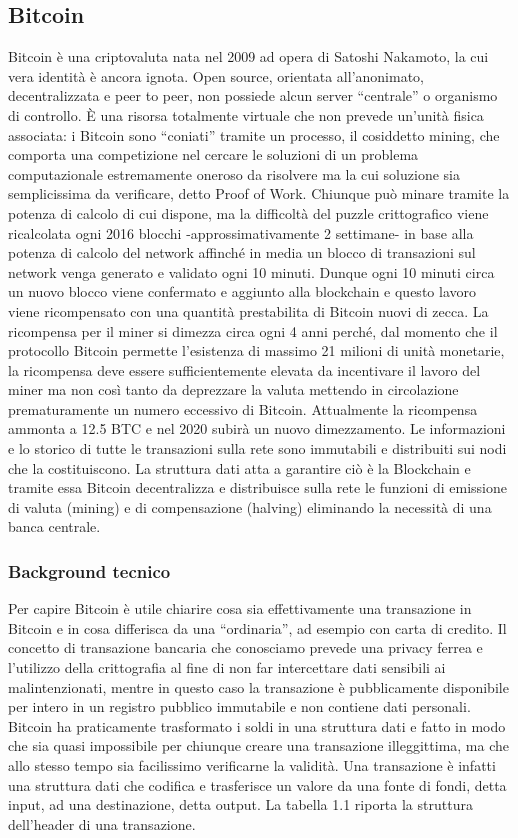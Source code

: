 \subsection{Bitcoin}
Bitcoin è una criptovaluta nata nel 2009 ad opera di Satoshi Nakamoto, la cui vera identità è ancora ignota. Open source, orientata all’anonimato, decentralizzata e peer to peer, non possiede alcun server “centrale” o organismo di controllo. È una risorsa totalmente virtuale che non prevede un’unità fisica associata: i Bitcoin sono “coniati” tramite un processo, il cosiddetto mining, che comporta una competizione nel cercare le soluzioni di un problema computazionale estremamente oneroso da risolvere ma la cui soluzione sia semplicissima da verificare, detto Proof of Work.
Chiunque può minare tramite la potenza di calcolo di cui dispone, ma la difficoltà del puzzle crittografico viene ricalcolata ogni 2016 blocchi -approssimativamente 2 settimane- in base alla potenza di calcolo del network affinché in media un blocco di transazioni sul network venga generato e validato ogni 10 minuti. Dunque ogni 10 minuti circa un nuovo blocco viene confermato e aggiunto alla blockchain e questo lavoro viene ricompensato con una quantità prestabilita di Bitcoin nuovi di zecca. 
La ricompensa per il miner si dimezza circa ogni 4 anni perché, dal momento che il protocollo Bitcoin permette l’esistenza di massimo 21 milioni di unità monetarie, la ricompensa deve essere sufficientemente elevata da incentivare il lavoro del miner ma non così tanto da deprezzare la valuta mettendo in circolazione prematuramente un numero eccessivo di Bitcoin. Attualmente la ricompensa ammonta a 12.5 BTC e nel 2020 subirà un nuovo dimezzamento.
Le informazioni e lo storico di tutte le transazioni sulla rete sono immutabili e distribuiti sui nodi che la costituiscono. La struttura dati atta a garantire ciò è la Blockchain e tramite essa Bitcoin decentralizza e distribuisce sulla rete le funzioni di emissione di valuta (mining) e di compensazione (halving) eliminando la necessità di una banca centrale.



\subsubsection{Background tecnico}
Per capire Bitcoin è utile chiarire cosa sia effettivamente una transazione in Bitcoin e in cosa differisca da una “ordinaria”, ad esempio con carta di credito. Il concetto di transazione bancaria che conosciamo prevede una privacy ferrea e l’utilizzo della crittografia al fine di non far intercettare dati sensibili ai malintenzionati, mentre in questo caso la transazione è pubblicamente disponibile per intero in un registro pubblico immutabile e non contiene dati personali. Bitcoin ha praticamente trasformato i soldi in una struttura dati e fatto in modo che sia quasi impossibile per chiunque creare una transazione illeggittima, ma che allo stesso tempo sia facilissimo verificarne la validità. Una transazione è infatti una struttura dati che codifica e trasferisce un valore da una fonte di fondi, detta input, ad una destinazione, detta output. La tabella 1.1 riporta la struttura dell'header di una transazione.

